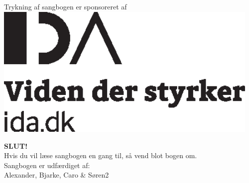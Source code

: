 \newpage
{}
\pagecolor{mypink}

\pagestyle{empty}
\begin{center}

{\large\textcolor{sort}{Trykning af sangbogen er sponsoreret af \vspace{2cm}}} \\
\includegraphics[width=0.96\textwidth]{res/idablack.eps} \\

%
%

\vspace{7cm}

{\Huge \textbf{\textcolor{sort}{SLUT!}}}\\
{\large\textcolor{sort}{ Hvis du vil læse sangbogen en gang til, så vend blot bogen
  om.}}\\
\vspace{0.5cm}
\textcolor{sort}{Sangbogen er udfærdiget af:\\
Alexander, Bjarke, Caro \& Søren2}
\end{center}
